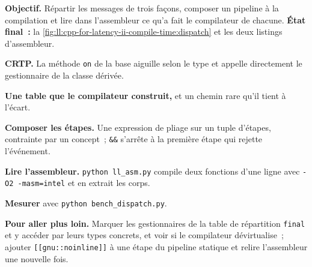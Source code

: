 \begin{tutorial}
\textbf{Objectif.} Répartir les messages de trois façons, composer un pipeline à la compilation et lire dans l'assembleur ce qu'a fait le compilateur de chacune.
\textbf{État final~:} la \cref{fig:ll:cpp-for-latency-ii-compile-time:dispatch} et les deux listings d'assembleur.
\begin{tutsteps}
\item \textbf{CRTP.} La méthode \texttt{on} de la base aiguille selon le type et appelle directement le gestionnaire de la classe dérivée.
\label{lst:ll:cpp-for-latency-ii-compile-time:crtp}
\item \textbf{Une table que le compilateur construit,} et un chemin rare qu'il tient à l'écart.
\label{lst:ll:cpp-for-latency-ii-compile-time:consteval}
\item \textbf{Composer les étapes.} Une expression de pliage sur un tuple d'étapes, contrainte par un concept~; \texttt{\&\&} s'arrête à
la première étape qui rejette l'événement.
\label{lst:ll:cpp-for-latency-ii-compile-time:pipeline}
\item \textbf{Lire l'assembleur.} \texttt{python ll\_asm.py} compile deux fonctions d'une ligne avec
\texttt{-O2 -masm=intel} et en extrait les corps.
\label{lst:ll:cpp-for-latency-ii-compile-time:asm-static}
\label{lst:ll:cpp-for-latency-ii-compile-time:asm-dyn}
\item \textbf{Mesurer} avec \texttt{python bench\_dispatch.py}.
\end{tutsteps}
\textbf{Pour aller plus loin.} Marquer les gestionnaires de la table de répartition \texttt{final} et y accéder par leurs types concrets,
et voir si le compilateur dévirtualise~; ajouter \texttt{[[gnu::noinline]]} à une étape du pipeline statique et relire
l'assembleur une nouvelle fois.
\end{tutorial}

